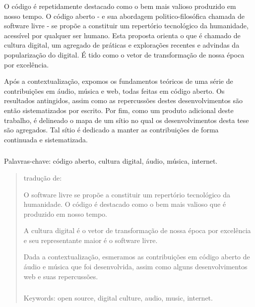 \begin{resumo}

O código é repetidamente destacado como o bem mais valioso produzido em nosso tempo.
O código aberto - e sua abordagem politico-filosófica chamada de software livre -
se propõe a constituir um repertório tecnológico da humanidade, acessível por
qualquer ser humano. Esta proposta orienta o que é chamado de cultura digital,
um agregado de práticas e explorações recentes e advindas da popularização do digital.
É tido como o vetor de transformação de nossa época por excelência.

Após a contextualização, expomos os fundamentos teóricos de uma série de contribuições em áudio, música
e web, todas feitas em código aberto. Os resultados antingidos, assim como as repercussões
destes desenvolvimentos são então sistematizados por escrito. Por fim, como um produto adicional
deste trabalho, é delineado o mapa de um sítio no qual os desenvolvimentos desta tese
são agregados. Tal sítio é dedicado a manter as contribuições de forma
continuada e sistematizada.

$\phantom{linha em branco}$\\
Palavras-chave: código aberto, cultura digital, áudio, música, internet.

\end{resumo}

\begin{abstract}

tradução de:

O software livre se propõe a constituir um repertório tecnológico da humanidade. O código
é destacado como o bem mais valioso que é produzido em nosso tempo.

A cultura digital é o vetor de transformação de nossa época por excelência e seu representante
maior é o software livre.

Dada a contextualização, esmeramos as contribuições em código aberto de áudio e música
que foi desenvolvida, assim como alguns desenvolvimentos web e suas repercussões.

$\phantom{linha em branco}$\\
Keywords: open source, digital culture, audio, music, internet.

\end{abstract}
